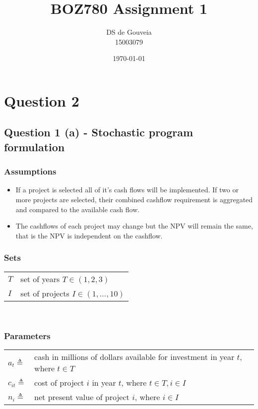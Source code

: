 \documentclass[a4paper,11pt]{article}
\title{BOZ780 Assignment 1}
\author{DS de Gouveia \\ 15003079}
\date{\today}
\begin{document}
\maketitle
\tableofcontents
\newpage

\section{Question 2}
\subsection{Question 1 (a) - Stochastic program formulation}

\subsubsection{Assumptions}
\begin{itemize}
	\item If a project is selected all of it's cash flows will be implemented. If two or more projects are selected, their combined cashflow requirement is aggregated and compared to the available cash flow.
	\item The cashflows of each project may change but the NPV will remain the same, that is the NPV is independent on the cashflow. 
\end{itemize}


\subsubsection{Sets}

\begin{tabular}{ll}
$T$ & set of years $T \in (1,2,3)$ \\
$I$ & set of projects $I \in (1,\dots, 10)$ 
\end{tabular}\\

\subsubsection{Parameters}

\begin{tabular}{ll}
$a_{t} \triangleq$ & cash in millions of dollars available for investment in year $t$, where  $t \in T$\\
$c_{it} \triangleq$ & cost of project $i$ in year $t$, where $t \in T, i \in I$\\
$n_{i} \triangleq$ & net present value of project $i$, where  $i \in I$\\
\end{tabular}
\end{document}
